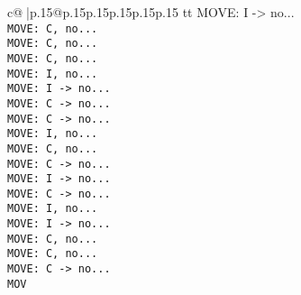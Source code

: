 \documentclass{article}
\begin{document}
{\begin{supertabular}{c@{$\;$}|p{.15\linewidth}@{}p{.15\linewidth}p{.15\linewidth}p{.15\linewidth}p{.15\linewidth}p{.15\linewidth}}
{{{tt  MOVE: I -> no...\\ \tt  MOVE: C, no...\\ \tt  MOVE: C, no...\\ \tt  MOVE: C, no...\\ \tt  MOVE: I, no...\\ \tt  MOVE: I -> no...\\ \tt  MOVE: C -> no...\\ \tt  MOVE: C -> no...\\ \tt  MOVE: I, no...\\ \tt  MOVE: C, no...\\ \tt  MOVE: C -> no...\\ \tt  MOVE: I -> no...\\ \tt  MOVE: C -> no...\\ \tt  MOVE: I, no...\\ \tt  MOVE: I -> no...\\ \tt  MOVE: C, no...\\ \tt  MOVE: C, no...\\ \tt  MOVE: C -> no...\\ \tt  MOV}}}
\end{supertabular}}
\end{document}

